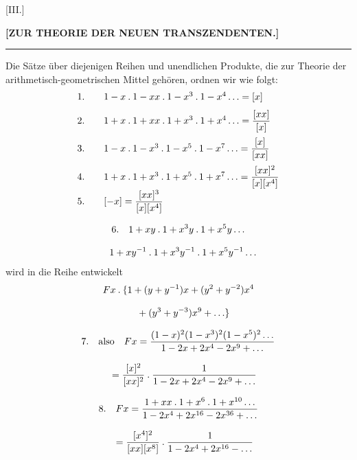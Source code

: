 \begingroup
\renewcommand{\arraystretch}{1.45}
\clearpage{}
\begin{center}
[III.]\par
\textbf{[ZUR THEORIE DER NEUEN TRANSZENDENTEN.]}\par
\rule{13mm}{0.3pt}
\end{center}
Die Sätze über diejenigen Reihen und unendlichen Produkte, die zur Theorie der arithmetisch-geometrischen Mittel gehören, ordnen wir wie folgt:
\[
\begin{array}{r@{\qquad}l}
1.&1-x\mathbin{.}1-xx\mathbin{.}1-x^3\mathbin{.}1-x^4\mathinner{.\,.\,.}=[x]\\[7pt]
2.&1+x\mathbin{.}1+xx\mathbin{.}1+x^3\mathbin{.}1+x^4\mathinner{.\,.\,.}=\dfrac{[xx]}{[x]}\\[11pt]
3.&1-x\mathbin{.}1-x^3\mathbin{.}1-x^5\mathbin{.}1-x^7\mathinner{.\,.\,.}=\dfrac{[x]}{[xx]}\\[11pt]
4.&1+x\mathbin{.}1+x^3\mathbin{.}1+x^5\mathbin{.}1+x^7\mathinner{.\,.\,.}=\dfrac{[xx]^2}{[x][x^4]}\\[7pt]
5.&[-x]=\dfrac{[xx]^3}{[x][x^4]}
\end{array}
\]

\[
\begin{gathered}6.\quad1+xy\mathbin{.}1+x^3y\mathbin{.}1+x^5y\mathinner{.\,.\,.}
\\[8pt]\quad{}1+xy^{-1}\mathbin{.}1+x^3y^{-1}\mathbin{.}1+x^5y^{-1}\mathinner{.\,.\,.}\end{gathered}
\]
wird in die Reihe entwickelt
\[
\begin{gathered}Fx\mathbin{.}\{1+(y+y^{-1})x+(y^2+y^{-2})x^4\\[8pt]\quad{}+(y^3+y^{-3})x^9+\mathinner{.\,.\,.}\}\end{gathered}
\]

\[
\begin{gathered}7.\quad\text{also}\quad
Fx=\frac{(1-x)^2(1-x^3)^2(1-x^5)^2\mathinner{.\,.\,.}}
{1-2x+2x^4-2x^9+\mathinner{.\,.\,.}}
\\[8pt]\quad{}=\frac{[x]^2}{[xx]^2}\mathbin{.}
\frac{1}{1-2x+2x^4-2x^9+\mathinner{.\,.\,.}}\end{gathered}
\]

\[
\begin{gathered}8.\quad Fx=
\frac{1+xx\mathbin{.}1+x^6\mathbin{.}1+x^{10}\mathinner{.\,.\,.}}
{1-2x^4+2x^{16}-2x^{36}+\mathinner{.\,.\,.}}
\\[8pt]\quad{}=\frac{[x^4]^2}{[xx][x^8]}\mathbin{.}
\frac{1}{1-2x^4+2x^{16}-\mathinner{.\,.\,.}}\end{gathered}
\]

